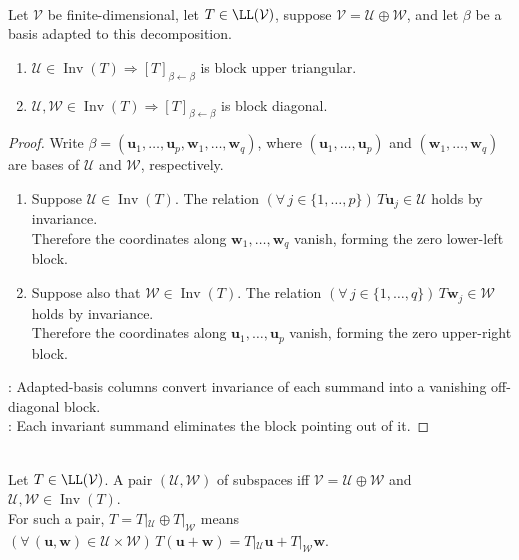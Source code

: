 \begin{proposition} \label{prop:invariant-subspaces-and-block-form} \\
Let $\mathcal{V}$ be finite-dimensional, let $T\in\LL(\mathcal{V})$, suppose $\mathcal{V}=\mathcal{U}\oplus\mathcal{W}$, and let $\beta$ be a basis adapted to this decomposition.
\begin{enumerate}[label=(\roman*)]
\setlength{\itemsep}{0pt}
\item $\mathcal{U}\in\operatorname{Inv}(T)\Longrightarrow[T]_{\beta\leftarrow\beta}$ is block upper triangular.
\item $\mathcal{U},\mathcal{W}\in\operatorname{Inv}(T)\Longrightarrow[T]_{\beta\leftarrow\beta}$ is block diagonal.
\end{enumerate}
\begin{proof}
Write $\beta=(\mathbf{u}_1,\ldots,\mathbf{u}_p,\mathbf{w}_1,\ldots,\mathbf{w}_q)$, where $(\mathbf{u}_1,\ldots,\mathbf{u}_p)$ and $(\mathbf{w}_1,\ldots,\mathbf{w}_q)$ are bases of $\mathcal{U}$ and $\mathcal{W}$, respectively.
\begin{enumerate}[label=(\roman*)]
\setlength{\itemsep}{0pt}
\item Suppose $\mathcal{U}\in\operatorname{Inv}(T)$. The relation $(\forall\,j\in\{1,\ldots,p\})\,T\mathbf{u}_j\in\mathcal{U}$ holds by invariance.\\
Therefore the coordinates along $\mathbf{w}_1,\ldots,\mathbf{w}_q$ vanish, forming the zero lower-left block.
\item Suppose also that $\mathcal{W}\in\operatorname{Inv}(T)$. The relation $(\forall\,j\in\{1,\ldots,q\})\,T\mathbf{w}_j\in\mathcal{W}$ holds by invariance.\\
Therefore the coordinates along $\mathbf{u}_1,\ldots,\mathbf{u}_p$ vanish, forming the zero upper-right block.
\end{enumerate}
: Adapted-basis columns convert invariance of each summand into a vanishing off-diagonal block.\\
: Each invariant summand eliminates the block pointing out of it.
\end{proof}
\end{proposition}

\begin{definition} \label{def:reducing-pair-and-direct-sum-operator} \\
Let $T\in\LL(\mathcal{V})$. A pair $(\mathcal{U},\mathcal{W})$ of subspaces  iff $\mathcal{V}=\mathcal{U}\oplus\mathcal{W}$ and $\mathcal{U},\mathcal{W}\in\operatorname{Inv}(T)$.\\
For such a pair, $T=T|_{\mathcal{U}}\oplus T|_{\mathcal{W}}$ means $(\forall\,(\mathbf{u},\mathbf{w})\in\mathcal{U}\times\mathcal{W})\,T(\mathbf{u}+\mathbf{w})=T|_{\mathcal{U}}\mathbf{u}+T|_{\mathcal{W}}\mathbf{w}$.
\end{definition}


